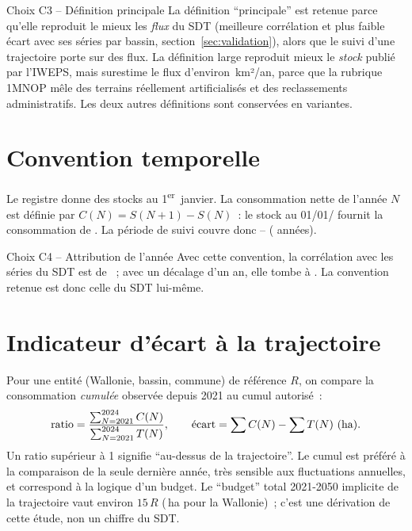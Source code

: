 \documentclass[11pt,a4paper]{report}
\newcommand{\ha}{\,ha}
\newcommand{\kmdan}{\,km²/an}
\begin{document}
\begin{choix}{Choix C3 -- Définition principale}
La définition \enquote{principale} est retenue parce qu'elle reproduit le mieux les \emph{flux} du SDT (meilleure corrélation et plus faible écart avec ses séries par bassin, section~\ref{sec:validation}), alors que le suivi d'une trajectoire porte sur des flux. La définition large reproduit mieux le \emph{stock} publié par l'IWEPS, mais surestime le flux d'environ \EcartFluxLarge\kmdan, parce que la rubrique 1MNOP mêle des terrains réellement artificialisés et des reclassements administratifs. Les deux autres définitions sont conservées en variantes.
\end{choix}

\section{Convention temporelle}
Le registre donne des stocks au 1\textsuperscript{er}~janvier. La consommation nette de l'année $N$ est définie par $C(N) = S(N+1) - S(N)$~: le stock au 01/01/\AnneeStock{} fournit la consommation de \AnneeFinObs. La période de suivi couvre donc \AnneeDebutObs--\AnneeFinObs{} (\NbAnneesObs{} années).

\begin{choix}{Choix C4 -- Attribution de l'année}
Avec cette convention, la corrélation avec les séries du SDT est de \ValPrincCorr{}~; avec un décalage d'un an, elle tombe à \ValPrincCorrLag. La convention retenue est donc celle du SDT lui-même.
\end{choix}

\section{Indicateur d'écart à la trajectoire}
Pour une entité (Wallonie, bassin, commune) de référence $R$, on compare la consommation \emph{cumulée} observée depuis 2021 au cumul autorisé~:
\[
\text{ratio} = \frac{\sum_{N=2021}^{\AnneeFinObs} C(N)}{\sum_{N=2021}^{\AnneeFinObs} T(N)}, \qquad \text{écart} = \sum C(N) - \sum T(N)\ \text{(ha)}.
\]
Un ratio supérieur à 1 signifie \enquote{au-dessus de la trajectoire}. Le cumul est préféré à la comparaison de la seule dernière année, très sensible aux fluctuations annuelles, et correspond à la logique d'un budget. Le \enquote{budget} total 2021-2050 implicite de la trajectoire vaut environ $15\,R$ (\WalBudget\ha{} pour la Wallonie)~; c'est une dérivation de cette étude, non un chiffre du SDT.
\end{document}
